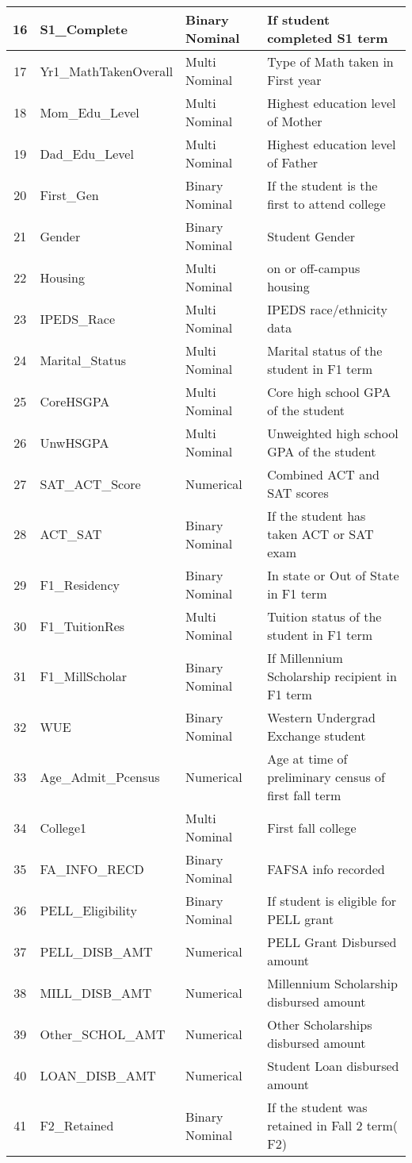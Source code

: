 \documentclass[11pt,openright]{report}
\begin{document}
\begin{longtable}{|c|l|l|l|}
		16 	&S1\_Complete		&	Binary	Nominal	&	If student completed S1 term			\\ \hline
		17	&Yr1\_MathTakenOverall & Multi Nominal		&	Type of Math taken in First year			\\ \hline
		18 	&Mom\_Edu\_Level		&	Multi Nominal		&	Highest education level of Mother		\\ \hline
		19 	&Dad\_Edu\_Level		&	Multi Nominal		&	Highest education level of Father			\\ \hline
		20 	&First\_Gen			&	Binary Nominal	&	If the student is the first to attend college		\\ \hline
		21 	&Gender			&	Binary Nominal	&	Student Gender					\\ \hline
		22 	&Housing			&	Multi Nominal		&	on or off-campus housing				\\ \hline
		23 	&IPEDS\_Race		&	Multi Nominal		&	IPEDS race/ethnicity data				\\ \hline
		24 	&Marital\_Status		&	Multi Nominal		&	Marital status of the student in F1 term	\\ \hline
		25 	&CoreHSGPA			&	Multi Nominal		&	Core high school GPA of the student		\\ \hline
		26 	&UnwHSGPA			&	Multi Nominal		&	Unweighted high school GPA of the student	\\ \hline
		27 	&SAT\_ACT\_Score		&	Numerical		&	Combined ACT and SAT scores			\\ \hline
		28 	&ACT\_SAT			&	Binary Nominal	&	If the student has taken ACT or SAT exam	\\ \hline
		29 	&F1\_Residency		&	Binary Nominal	&	In state or Out of State in F1 term		\\ \hline
		30 	&F1\_TuitionRes		&	Multi Nominal		&	Tuition status of the student in F1 term \\ \hline
		31	&F1\_MillScholar		&	Binary Nominal		& 	If Millennium Scholarship recipient in F1 term  \\ \hline
		32	&WUE				&	Binary Nominal		&	Western Undergrad Exchange student  \\ \hline
		33	&Age\_Admit\_Pcensus	&	Numerical			&	Age at time of preliminary census of first fall term \\ \hline
		34	&College1				& Multi Nominal			& 	First fall college			\\ \hline
		35	&FA\_INFO\_RECD		&Binary Nominal		&	FAFSA info recorded		\\ \hline
		36	&PELL\_Eligibility		&Binary Nominal		&	If student is eligible for PELL grant \\ \hline
		37	&PELL\_DISB\_AMT &Numerical			&	PELL Grant Disbursed amount \\ \hline
		38	&MILL\_DISB\_AMT		& Numerical			&	Millennium Scholarship disbursed amount	  \\ \hline
		39	&Other\_SCHOL\_AMT & Numerical		&   	Other Scholarships disbursed amount \\ \hline
		40	&LOAN\_DISB\_AMT	&Numerical	&	Student Loan disbursed amount 	\\ \hline
		41	& F2\_Retained			&Binary Nominal &	If the student was retained in Fall 2 term( F2)

\end{longtable}
 
\end{document}
